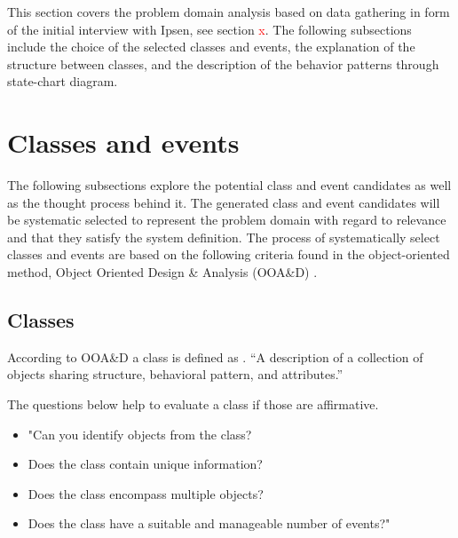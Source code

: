 This section covers the problem domain analysis based on data gathering in form of the initial interview with Ipsen, see section \textcolor{red}{x}.
The following subsections include the choice of the selected classes and events, the explanation of the structure between classes, and the description of the behavior patterns through state-chart diagram.

\section{Classes and events}
The following subsections explore the potential class and event candidates as well as the thought process behind it.
The generated class and event candidates will be systematic selected to represent the problem domain with regard to relevance and that they satisfy the system definition.
The process of systematically select classes and events are based on the following criteria found in the object-oriented method, Object Oriented Design \& Analysis (OOA\&D) \cite{Rod-Aalborg} .

\subsection{Classes} \label{sec:Classes}
According to OOA\&D a class is defined as \citep[p.~55]{Rod-Aalborg}.
“A description of a collection of objects sharing structure, behavioral pattern, and attributes.”

The questions below help to evaluate a class if those are affirmative. \citep[p.~62]{Rod-Aalborg}
\begin{itemize}
	\item "Can you identify objects from the class?
	\item Does the class contain unique information?
	\item Does the class encompass multiple objects?
	\item Does the class have a suitable and manageable number of events?"
\end{itemize}

